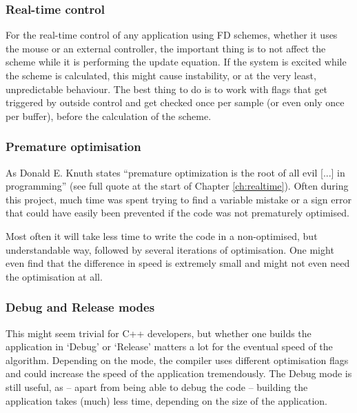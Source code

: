 \subsubsection{Real-time control}
For the real-time control of any application using FD schemes, whether it uses the mouse or an external controller, the important thing is to not affect the scheme while it is performing the update equation. If the system is excited while the scheme is calculated, this might cause instability, or at the very least, unpredictable behaviour. The best thing to do is to work with flags that get triggered by outside control and get checked once per sample (or even only once per buffer), before the calculation of the scheme.

\subsubsection{Premature optimisation}
As Donald E. Knuth states  ``premature optimization is the root of all evil [...] in programming'' \cite{Knuth1974} (see full quote at the start of Chapter \ref{ch:realtime}). Often during this project, much time was spent trying to find a variable mistake or a sign error that could have easily been prevented if the code was not prematurely optimised. 

Most often it will take less time to write the code in a non-optimised, but understandable way, followed by several iterations of optimisation. One might even find that the difference in speed is extremely small and might not even need the optimisation at all.


\subsubsection{Debug and Release modes}
This might seem trivial for C++ developers, but whether one builds the application in `Debug' or `Release' matters a lot for the eventual speed of the algorithm. Depending on the mode, the compiler uses different optimisation flags and could increase the speed of the application tremendously. The Debug mode is still useful, as -- apart from being able to debug the code -- building the application takes (much) less time, depending on the size of the application.

